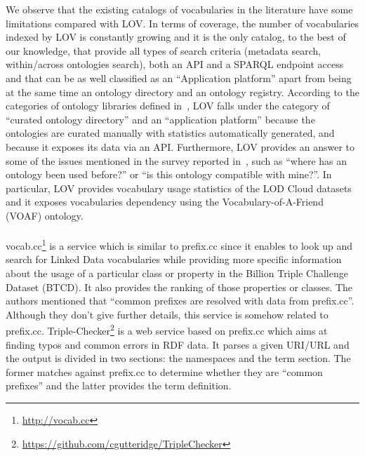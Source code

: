We observe that the existing catalogs of vocabularies in the literature have some limitations compared with LOV. In terms of coverage, the number of vocabularies indexed by LOV is constantly growing and it is the only catalog, to the best of our knowledge, that provide all types of search criteria (metadata search, within/across ontologies search), both an API and a SPARQL endpoint access and that can be as well classified as an ``Application platform'' apart from being at the same time an ontology directory and an ontology registry. According to the categories of ontology libraries defined in~\cite{AquinJoWS12}, LOV falls under the category of ``curated ontology directory'' and an ``application platform'' because the ontologies are curated manually with statistics automatically generated, and because it exposes its data via an API. Furthermore, LOV provides an answer to some of the issues mentioned in the survey reported in~\cite{AquinJoWS12}, such as ``where has an ontology been used before?'' or ``is this ontology compatible with mine?''. In particular, LOV provides vocabulary usage statistics of the LOD Cloud datasets and it exposes vocabularies dependency using the Vocabulary-of-A-Friend (VOAF) ontology.

\paragraph{}
vocab.cc\footnote{\url{http://vocab.cc}} is a service which is similar to prefix.cc since it enables to look up and search for Linked Data vocabularies while providing more specific information about the usage of a particular class or property in the Billion Triple Challenge Dataset (BTCD). It also provides the ranking of those properties or classes. The authors mentioned that ``common prefixes are resolved with data from prefix.cc''. Although they don't give further details, this service is somehow related to prefix.cc. Triple-Checker\footnote{\url{https://github.com/cgutteridge/TripleChecker}} is a web service based on prefix.cc which aims at finding typos and common errors in RDF data. It parses a given URI/URL and the output is divided in two sections: the namespaces and the term section. The former matches against prefix.cc to determine whether they are ``common prefixes'' and the latter provides the term definition.


